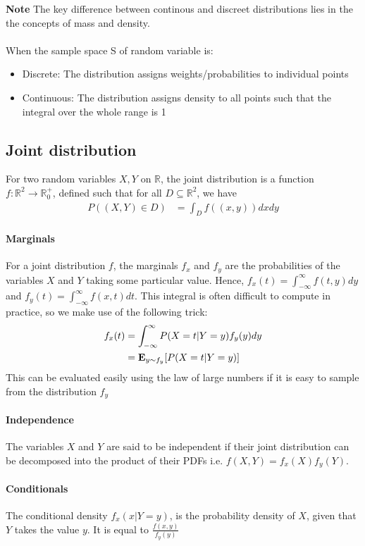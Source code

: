 \documentclass[12pt]{article}
\begin{document}
\textbf{Note} The key difference between continous and discreet distributions lies in the the concepts of mass and density. \\ \\
When the sample space S of random variable is:
\begin{itemize}
\item Discrete: The distribution assigns weights/probabilities to individual points
\item Continuous: The distribution assigns density to all points such that the integral over the whole range is 1
\end{itemize}

\subsection{Joint distribution}
For two random variables $X, Y$ on $\mathbb{R}$, the joint distribution is a function $f : \mathbb{R}^2 \to \mathbb{R}_0^+$, defined such that for all $D \subseteq \mathbb{R}^2$, we have
\begin{align*}
    P((X, Y) \in D) &= \int_D f((x, y)) dxdy
\end{align*}
\paragraph{Marginals} For a joint distribution $f$, the marginals $f_x$ and $f_y$ are the probabilities of the variables $X$ and $Y$ taking some particular value. Hence, $f_x(t) = \int_{-\infty}^{\infty} f(t, y) dy$ and $f_y(t) = \int_{-\infty}^{\infty} f(x, t) dt$. This integral is often difficult to compute in practice, so we make use of the following trick:
\begin{align*}
    f_x(t) &= \int_{-\infty}^{\infty} P(X = t|Y = y) f_y(y)dy\\
         &=  {\bf E}_{y \sim f_y}[P(X=t | Y=y)]
\end{align*}
This can be evaluated easily using the law of large numbers if it is easy to sample from the distribution $f_y$
\paragraph{Independence} The variables $X$ and $Y$ are said to be independent if their joint distribution can be decomposed into the product of their PDFs i.e. $f(X,Y) = f_x(X) f_y(Y)$.
\paragraph{Conditionals} The conditional density $f_x(x | Y = y)$, is the probability density of $X$, given that $Y$ takes the value $y$. It is equal to $\frac{f(x,y)}{f_y(y)}$
\end{document}
